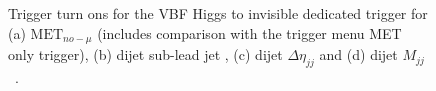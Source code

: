 \begin{figure}[!htp]
\centering
{}
 \\
 \\
\caption{Trigger turn ons for the \gls{VBF} Higgs to invisible dedicated trigger for (a) $\text{MET}_{no-\mu}$ (includes comparison with the trigger menu \gls{MET} only trigger), (b) dijet sub-lead jet \pt, (c) dijet $\Delta\eta_{jj}$ and (d) dijet $M_{jj}$~\cite{IMAGEREF:LHCJamboree}.}
\label{FIGURE:RunIIPreparation_HLT_TriggerTurnOns}
\end{figure}

